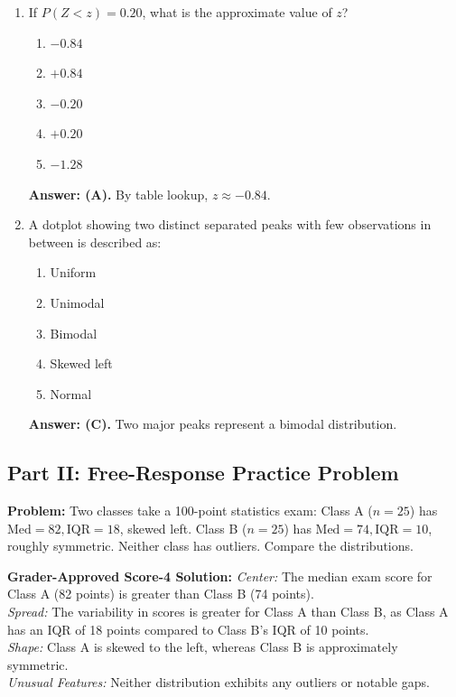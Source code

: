 \begin{enumerate}[resume, leftmargin=1.5em]
  \item If $P(Z < z) = 0.20$, what is the approximate value of $z$?
  \begin{enumerate}[label=(\Alph*)]
    \item $-0.84$ \item $+0.84$ \item $-0.20$ \item $+0.20$ \item $-1.28$
  \end{enumerate}
  \textbf{Answer: (A).} By table lookup, $z \approx -0.84$.

  \item A dotplot showing two distinct separated peaks with few observations in between is described as:
  \begin{enumerate}[label=(\Alph*)]
    \item Uniform \item Unimodal \item Bimodal \item Skewed left \item Normal
  \end{enumerate}
  \textbf{Answer: (C).} Two major peaks represent a bimodal distribution.
\end{enumerate}

\subsection*{Part II: Free-Response Practice Problem}

\begin{workbookbox}
\textbf{Problem:} Two classes take a 100-point statistics exam: Class A ($n=25$) has $\text{Med}=82, \text{IQR}=18$, skewed left. Class B ($n=25$) has $\text{Med}=74, \text{IQR}=10$, roughly symmetric. Neither class has outliers. Compare the distributions.

\textbf{Grader-Approved Score-4 Solution:}
\textit{Center:} The median exam score for Class A (82 points) is greater than Class B (74 points).\\
\textit{Spread:} The variability in scores is greater for Class A than Class B, as Class A has an IQR of 18 points compared to Class B's IQR of 10 points.\\
\textit{Shape:} Class A is skewed to the left, whereas Class B is approximately symmetric.\\
\textit{Unusual Features:} Neither distribution exhibits any outliers or notable gaps.
\end{workbookbox}


